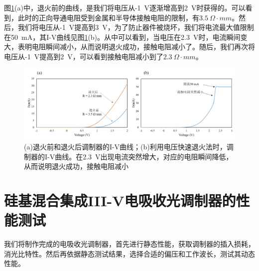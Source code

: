 图\ref{chapt4_3D_resist}(a)中，退火前的曲线，是我们将电压从-1~V逐渐增高到2~V时获得的。可以看到，此时的正向导通电阻受到金属和半导体接触电阻的限制，有$3.5~ \Omega \cdot mm$。然后，我们将电压从-1~V提高到3~V，为了防止器件被烧坏，我们将电流最大值限制在50~mA，其I-V曲线见图\ref{chapt4_3D_resist}(b)。从中可以看到，当电压在2.3~V时，电流瞬间变大，表明电阻瞬间减小，从而说明退火成功，接触电阻减小了。随后，我们再次将电压从-1~V提高到2~V，可以看到接触电阻减小到了$2.3~ \Omega \cdot mm$。
\begin{figure}[htb]
	\centering
	\includegraphics[width=15cm]{./Pictures/chapt4_3D_resist.jpg}
	\caption{(a)退火前和退火后调制器的I-V曲线；(b)利用电压快速退火法时，调制器的I-V曲线。在2.3~V出现电流突然增大，对应的电阻瞬间降低，从而说明退火成功，接触电阻减小}
	\label{chapt4_3D_resist}
\end{figure}
\section{硅基混合集成III-V电吸收光调制器的性能测试}
我们将制作完成的电吸收光调制器，首先进行静态性能，获取调制器的插入损耗，消光比特性。然后再依据静态测试结果，选择合适的偏压和工作波长，测试其动态性能。
